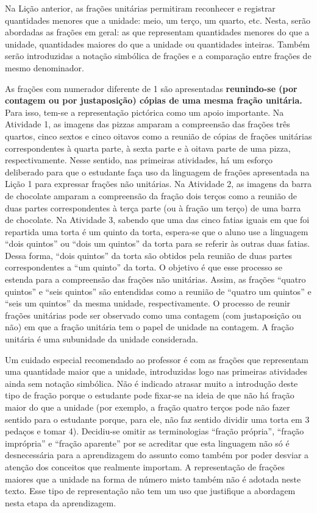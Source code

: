 
\noindent {\color{special}{\Large \bf LIÇÃO 2 - Para o professor}}
\vspace{.5cm}

Na Lição anterior, as frações unitárias permitiram reconhecer e registrar quantidades menores que a unidade: meio, um terço, um quarto, etc. Nesta, serão abordadas as frações em geral: as que representam quantidades menores do que a unidade, quantidades maiores do que a unidade ou quantidades inteiras. Também serão introduzidas a notação simbólica de frações e a comparação entre frações de mesmo denominador. 

As frações com numerador diferente de 1 são apresentadas \textbf{reunindo-se (por contagem ou por justaposição) cópias de uma mesma fração unitária.} Para isso, tem-se a representação pictórica como um apoio importante.
Na Atividade 1, as imagens das pizzas amparam a compreensão das frações três quartos, cinco sextos e cinco oitavos como a reunião de cópias de frações unitárias correspondentes à quarta parte, à sexta parte e à oitava parte de uma pizza, respectivamente. Nesse sentido, nas primeiras atividades, há um esforço deliberado para que o estudante faça uso da linguagem de frações apresentada na Lição 1 para expressar frações não unitárias. Na Atividade 2, as imagens da barra de chocolate amparam a compreensão da fração dois terços como a reunião de duas partes correspondentes à terça parte (ou à fração um terço) de uma barra de chocolate.
 Na Atividade 3, sabendo que uma das cinco fatias iguais em que foi repartida uma torta é um quinto da torta, espera-se que o aluno use a linguagem ``dois quintos'' ou ``dois um quintos'' da torta para se referir às outras duas fatias.
Dessa forma, ``dois quintos'' da torta são obtidos pela reunião de duas partes correspondentes a ``um quinto'' da torta.
O objetivo é que esse processo se estenda para a compreensão das frações não unitárias.
Assim, as frações ``quatro quintos'' e ``seis quintos'' são entendidas como a reunião de ``quatro um quintos'' e ``seis um quintos'' da mesma unidade, respectivamente. O processo de reunir frações unitárias pode ser observado como uma contagem (com justaposição ou não) em que a fração unitária tem o papel de unidade na contagem. A fração unitária é uma subunidade da unidade considerada. 

Um cuidado especial recomendado ao professor é com as frações que representam uma quantidade maior que a unidade, introduzidas logo nas primeiras atividades ainda sem notação simbólica. Não é indicado atrasar muito a introdução deste tipo de fração porque o estudante pode fixar-se na ideia de que não há fração maior do que a unidade  (por exemplo, a fração quatro terços pode não fazer sentido para o estudante porque, para ele, não faz sentido dividir uma torta em 3 pedaços e tomar 4). Decidiu-se omitir as terminologias ``fração própria'', ``fração imprópria'' e ``fração aparente'' por se acreditar que esta linguagem não só é desnecessária para a aprendizagem do assunto como também por poder desviar a atenção dos conceitos que realmente importam.
A representação de frações maiores que a unidade na forma de número misto também não é adotada neste texto. Esse tipo de representação não tem um uso que justifique a abordagem nesta etapa da aprendizagem.

